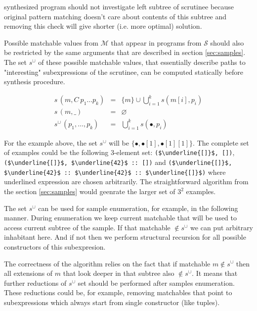 \noindent synthesized program should not investigate left subtree of scrutinee because original pattern matching doesn't care about contents of this subtree and removing this check will give shorter (i.e. more optimal) solution.

Possible matchable values  from $\mathcal{M}$ that appear in programs from  $\mathcal{S}$  should also be restricted by the same arguments that are described in section \ref{sec:samples}. The set $s^\cup$ of these possible matchable values, that essentially describe paths to "interesting" subexpressions of the scrutinee, can be computed statically before synthesis procedure.

\[
\begin{array}{rcl}
   s\,(m, C\ p_1 \dots p_k)     & = & \{m\}\cup \bigcup\limits_{i=1}^{k} s(m[i], p_i)\\
   s\,(m,\_)                 & = & \varnothing \\
   s^\cup\,(p_1,\dots, p_k) & = & \bigcup\limits_{i=1}^{k} s(\bullet, p_i)
\end{array}
\]

\noindent For the example above, the set  $s^\cup$ will be 
$\{\bullet, \bullet[1], \bullet[1][1]\}$. The complete set of examples could be the following 3-element set:
\lstinline=($\underline{[]}$, [])=, \lstinline=($\underline{[]}$, $\underline{42}$ :: [])= and  \lstinline=($\underline{[]}$, $\underline{42}$ :: $\underline{42}$ :: $\underline{[]}$)= where underlined expression are chosen arbitrarily. The straightforward algorithm from the section \ref{sec:samples} would geenrate the larger set of $3^2$ examples.

The set $s^\cup$ can be used for sample enumeration, for example, in the following manner. During enumeration we keep current matchable that will be used to access current subtree of the sample. If that matchable $\notin s^\cup$ we can put arbitrary inhabitant here. And if not then we perform structural recursion for all possible constructors of this subexpresion.

The correctness of the algorithm relies on the fact that if matchable  $m \notin s^\cup$ then all extensions of $m$ that look deeper in that subtree also $\notin s^\cup$. It means that further reductions of $s^\cup$ set should be performed after samples enumeration. These reductions could be, for example, removing matchables that point to subexpressions which always start from single constructor (like tuples).

